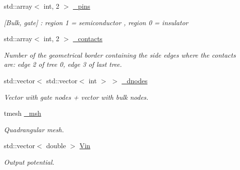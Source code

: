 \begin{DoxyCompactItemize}
\mbox{\label{class_probl_aacc6e8ee6e40d1a33c11de55dff8ed98}} 
std\+::array$<$ int, 2 $>$ \mbox{\hyperlink{class_probl_aacc6e8ee6e40d1a33c11de55dff8ed98}{\+\_\+pins}}
\begin{DoxyCompactList}\small\item\em \mbox{[}Bulk, gate\mbox{]} \+: region 1 = semiconductor , region 0 = insulator \end{DoxyCompactList}\item 
\mbox{\label{class_probl_ad0987da6c7975bf9018ff9891012695d}} 
std\+::array$<$ int, 2 $>$ \mbox{\hyperlink{class_probl_ad0987da6c7975bf9018ff9891012695d}{\+\_\+contacts}}
\begin{DoxyCompactList}\small\item\em Number of the geometrical border containing the side edges where the contacts are\+: edge 2 of tree 0, edge 3 of last tree. \end{DoxyCompactList}\item 
\mbox{\label{class_probl_a8889847da2dc2951c2dfa4721eff2c37}} 
std\+::vector$<$ std\+::vector$<$ int $>$ $>$ \mbox{\hyperlink{class_probl_a8889847da2dc2951c2dfa4721eff2c37}{\+\_\+dnodes}}
\begin{DoxyCompactList}\small\item\em Vector with gate nodes + vector with bulk nodes. \end{DoxyCompactList}\item 
\mbox{\label{class_probl_af4f306af8b9db4fd6422ece4eb4d2fe7}} 
tmesh \mbox{\hyperlink{class_probl_af4f306af8b9db4fd6422ece4eb4d2fe7}{\+\_\+msh}}
\begin{DoxyCompactList}\small\item\em Quadrangular mesh. \end{DoxyCompactList}\item 
\mbox{\label{class_probl_a28977a40e8789bec175404c711bdcee3}} 
std\+::vector$<$ double $>$ \mbox{\hyperlink{class_probl_a28977a40e8789bec175404c711bdcee3}{Vin}}
\begin{DoxyCompactList}\small\item\em Output potential. \end{DoxyCompactList}\item 
\mbox{\label{class_probl_a398affcfb0a2ac6033866f5c6a2d3d27}} 

\end{DoxyCompactItemize}
